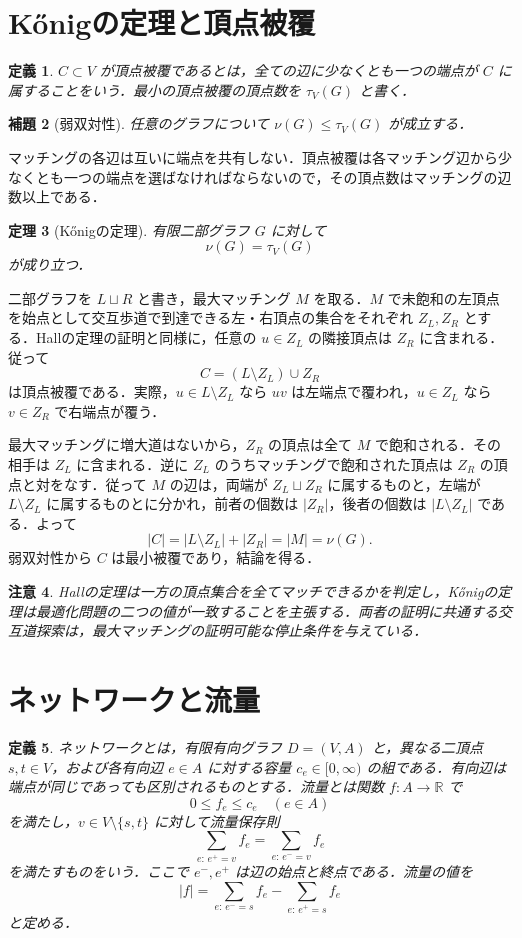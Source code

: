 \documentclass[a5paper,10pt,onecolumn]{jsarticle}
\makeatletter
\theoremstyle{mathnotetheorem}
\newtheorem{theorem}{定理}[section]
\newtheorem{definition}[theorem]{定義}
\newtheorem{lemma}[theorem]{補題}
\newtheorem{remark}[theorem]{注意}
\renewcommand{\proofname}{証明}
\renewenvironment{proof}[1][\proofname]{%
  \par\pushQED{\qed}\normalfont\topsep4\p@\@plus2\p@\relax
  \trivlist\item[\hskip\labelsep\bfseries #1]\ignorespaces
}{\popQED\endtrivlist\@endpefalse}
\makeatother
\begin{document}
\section{K\H{o}nigの定理と頂点被覆}
\begin{definition}
$C\subset V$ が\emph{頂点被覆}であるとは，全ての辺に少なくとも一つの端点が $C$ に属することをいう．最小の頂点被覆の頂点数を $\tau_V(G)$ と書く．
\end{definition}
\begin{lemma}[弱双対性]
任意のグラフについて $\nu(G)\le\tau_V(G)$ が成立する．
\end{lemma}
\begin{proof}
マッチングの各辺は互いに端点を共有しない．頂点被覆は各マッチング辺から少なくとも一つの端点を選ばなければならないので，その頂点数はマッチングの辺数以上である．
\end{proof}
\begin{theorem}[K\H{o}nigの定理]\label{thm:konig}
有限二部グラフ $G$ に対して
\[
 \nu(G)=\tau_V(G)
\]
が成り立つ．
\end{theorem}
\begin{proof}
二部グラフを $L\sqcup R$ と書き，最大マッチング $M$ を取る．$M$ で未飽和の左頂点を始点として交互歩道で到達できる左・右頂点の集合をそれぞれ $Z_L,Z_R$ とする．Hallの定理の証明と同様に，任意の $u\in Z_L$ の隣接頂点は $Z_R$ に含まれる．従って
\[
 C=(L\setminus Z_L)\cup Z_R
\]
は頂点被覆である．実際，$u\in L\setminus Z_L$ なら $uv$ は左端点で覆われ，$u\in Z_L$ なら $v\in Z_R$ で右端点が覆う．

最大マッチングに増大道はないから，$Z_R$ の頂点は全て $M$ で飽和される．その相手は $Z_L$ に含まれる．逆に $Z_L$ のうちマッチングで飽和された頂点は $Z_R$ の頂点と対をなす．従って $M$ の辺は，両端が $Z_L\sqcup Z_R$ に属するものと，左端が $L\setminus Z_L$ に属するものとに分かれ，前者の個数は $|Z_R|$，後者の個数は $|L\setminus Z_L|$ である．よって
\[
 |C|=|L\setminus Z_L|+|Z_R|=|M|=\nu(G).
\]
弱双対性から $C$ は最小被覆であり，結論を得る．
\end{proof}

\begin{remark}
Hallの定理は一方の頂点集合を全てマッチできるかを判定し，K\H{o}nigの定理は最適化問題の二つの値が一致することを主張する．両者の証明に共通する交互道探索は，最大マッチングの証明可能な停止条件を与えている．
\end{remark}

\section{ネットワークと流量}
\begin{definition}
\emph{ネットワーク}とは，有限有向グラフ $D=(V,A)$ と，異なる二頂点 $s,t\in V$，および各有向辺 $e\in A$ に対する\emph{容量} $c_e\in[0,\infty)$ の組である．有向辺は端点が同じであっても区別されるものとする．\emph{流量}とは関数 $f:A\to\mathbb R$ で
\[
 0\le f_e\le c_e\quad(e\in A)
\]
を満たし，$v\in V\setminus\{s,t\}$ に対して\emph{流量保存則}
\[
 \sum_{e:\,e^+=v}f_e=\sum_{e:\,e^-=v}f_e
\]
を満たすものをいう．ここで $e^-,e^+$ は辺の始点と終点である．流量の\emph{値}を
\[
 |f|=\sum_{e:\,e^-=s}f_e-\sum_{e:\,e^+=s}f_e
\]
と定める．
\end{definition}
\end{document}
